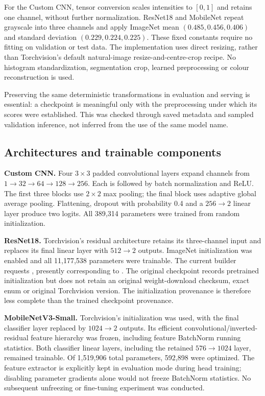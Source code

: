 \documentclass[11pt,a4paper]{article}
\newcommand{\code}[1]{\texttt{\detokenize{#1}}}
\begin{document}
For the Custom CNN, tensor conversion scales intensities to $[0,1]$ and retains one channel, without further normalization. ResNet18 and MobileNet repeat grayscale into three channels and apply ImageNet mean $(0.485,0.456,0.406)$ and standard deviation $(0.229,0.224,0.225)$. These fixed constants require no fitting on validation or test data. The implementation uses direct resizing, rather than Torchvision's default natural-image resize-and-centre-crop recipe. No histogram standardization, segmentation crop, learned preprocessing or colour reconstruction is used.

Preserving the same deterministic transformations in evaluation and serving is essential: a checkpoint is meaningful only with the preprocessing under which its scores were established. This was checked through saved metadata and sampled validation inference, not inferred from the use of the same model name.

\subsection{Architectures and trainable components}
\textbf{Custom CNN.} Four $3\times3$ padded convolutional layers expand channels from $1\rightarrow32\rightarrow64\rightarrow128\rightarrow256$. Each is followed by batch normalization and ReLU. The first three blocks use $2\times2$ max pooling; the final block uses adaptive global average pooling. Flattening, dropout with probability 0.4 and a $256\rightarrow2$ linear layer produce two logits. All 389,314 parameters were trained from random initialization.

\textbf{ResNet18.} Torchvision's residual architecture retains its three-channel input and replaces its final linear layer with $512\rightarrow2$ outputs. ImageNet initialization was enabled and all 11,177,538 parameters were trainable. The current builder requests \code{ResNet18_Weights.DEFAULT}, presently corresponding to \code{IMAGENET1K_V1}. The original checkpoint records pretrained initialization but does not retain an original weight-download checksum, exact enum or original Torchvision version. The initialization provenance is therefore less complete than the trained checkpoint provenance.

\textbf{MobileNetV3-Small.} Torchvision's \code{IMAGENET1K_V1} initialization was used, with the final classifier layer replaced by $1024\rightarrow2$ outputs. Its efficient convolutional/inverted-residual feature hierarchy was frozen, including feature BatchNorm running statistics. Both classifier linear layers, including the retained $576\rightarrow1024$ layer, remained trainable. Of 1,519,906 total parameters, 592,898 were optimized. The feature extractor is explicitly kept in evaluation mode during head training; disabling parameter gradients alone would not freeze BatchNorm statistics. No subsequent unfreezing or fine-tuning experiment was conducted.
\end{document}
